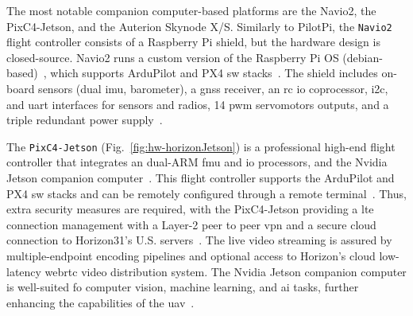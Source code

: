 The most notable companion computer-based platforms are the Navio2,
the PixC4-Jetson, and the Auterion Skynode X/S.  
Similarly to PilotPi, the \lstinline{Navio2} flight controller consists of a
Raspberry Pi shield, but the hardware design is closed-source.
Navio2 runs a custom version of the Raspberry Pi OS (debian-based)~\cite{navio2-sw}, which supports ArduPilot and PX4 \gls{sw}
stacks~\cite{arduPilot-Navio2,navio2-px4}.
  The shield includes on-board
  sensors (dual \gls{imu}, barometer), a \gls{gnss} receiver, an \gls{rc}
  \gls{io} coprocessor, \gls{i2c}, and
  \gls{uart} interfaces for sensors and radios, 14 \gls{pwm} servomotors
  outputs, and a triple redundant power supply~\cite{arduPilot-Navio2}.


  The \lstinline{PixC4-Jetson} (Fig.~\ref{fig:hw-horizonJetson}) is a
  professional high-end flight controller that integrates an dual-ARM
  \gls{fmu} and \gls{io} processors, and the Nvidia Jetson companion
  computer~\cite{arduPilot-horizonJetson}. This flight controller supports the
  ArduPilot and PX4 \gls{sw} stacks and can be remotely configured through a
  remote terminal~\cite{arduPilot-horizonJetson}. Thus, extra security measures are required, with the
  PixC4-Jetson providing a \gls{lte} connection management with a Layer-2 peer
  to peer \gls{vpn} and a secure cloud connection to Horizon31's
  U.S. servers~\cite{arduPilot-horizonJetson}. The live video streaming is
  assured by multiple-endpoint encoding pipelines and optional access to
  Horizon's cloud low-latency web\gls{rtc} video distribution system.
  The Nvidia Jetson companion computer is well-suited fo computer vision,
  machine learning, and \gls{ai} tasks, further enhancing the capabilities of
  the \gls{uav}~\cite{jetson-docs}.

